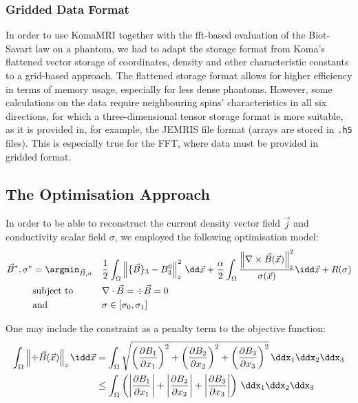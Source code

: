\documentclass[12pt]{article}
\renewcommand{\norm}[1]{\left\lVert#1\right\rVert_{\scriptscriptstyle 2}}
\begin{document}
  \subsubsection{Gridded Data Format}
  In order to use KomaMRI together with the \gls{fft}-based evaluation of the Biot-Savart law on a phantom, we had to adapt the storage format from Koma's flattened vector storage of coordinates, density and other characteristic constants to a grid-based approach.
  The flattened storage format allows for higher efficiency in terms of memory usage, especially for less dense phantoms.
  However, some calculations on the data require neighbouring spins' characteristics in all six directions, for which a three-dimensional tensor storage format is more suitable, as it is provided in, for example, the JEMRIS file format (arrays are stored in \texttt{.h5} files).
  This is especially true for the FFT, where data must be provided in gridded format.

  \subsection{The Optimisation Approach}
  \label{sec:optimisation-procedure}
  In order to be able to reconstruct the current density vector field $\vec{j}$ and conductivity scalar field $\sigma$, we employed the following optimisation model:
  \begin{align*}
    \vec{B}^*, \sigma^* & = \argmin_{\vec{B}, \sigma} &  & \frac{1}{2} \int_\Omega \norm{\{\vec{B}\}_3 - B_3^0}^2 \,\dd\vec{x} + \frac{\alpha}{2} \int_\Omega \frac{\norm{\nabla \times \vec{B}(\vec{x})}^2}{\sigma(\vec{x})} \idd\vec{x} + R(\sigma) \\
                        & \text{subject to}           &  & \nabla \cdot \vec{B} = \div \vec{B} = 0                                                                                                                                                    \\
                        & \text{and}                  &  & \sigma \in [\sigma_0, \sigma_1]
  \end{align*}

  One may include the constraint as a penalty term to the objective function:
  \begin{align*}
    \int_\Omega \norm{\div \vec{B}(\vec{x})} \idd\vec{x} & = \int_\Omega \sqrt{\left(\frac{\partial B_1}{\partial x_1}\right)^2 + \left(\frac{\partial B_2}{\partial x_2}\right)^2 + \left(\frac{\partial B_3}{\partial x_3}\right)^2} \,\ddx_1\ddx_2\ddx_3    \\
                                                         & \leq \int_\Omega \left(\left|\frac{\partial B_1}{\partial x_1}\right| + \left|\frac{\partial B_2}{\partial x_2}\right| + \left|\frac{\partial B_3}{\partial x_3}\right|\right) \,\ddx_1\ddx_2\ddx_3
  \end{align*}
\end{document}
